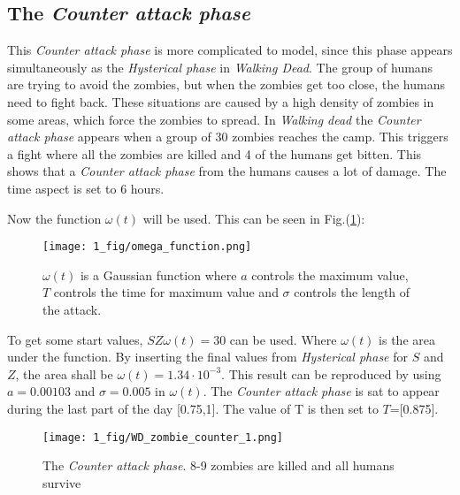 \documentclass[%
twoside,                 %
final,                   %
chapterprefix=true,      %
open=right               %
10pt]{book}
\begin{document}
\subsection{The \emph{Counter attack phase}}
\label{section:counter_attack}
This \emph{Counter attack phase} is more complicated to model, since this phase appears simultaneously as the \emph{Hysterical phase} in \emph{Walking Dead}. The group of humans are trying to avoid the zombies, but when the zombies get too close, the humans need to fight back. These situations are caused by a high density of zombies in some areas, which force the zombies to spread. In \emph{Walking dead} the \emph{Counter attack phase} appears when a group of 30 zombies reaches the camp. This triggers a fight where all the zombies are killed and 4 of the humans get bitten. This shows that a \emph{Counter attack phase} from the humans causes a lot of damage. The time aspect is set to 6 hours.  


\vspace{3mm}




\vspace{3mm}


Now the function $\omega(t)$ will be used. This can be seen in Fig.(\ref{fig:omega_function}):


\begin{figure}[ht]
  \centerline{\texttt{[image: 1\_fig/omega\_function.png]}}
  \caption{
  \label{fig:omega_function} $\omega (t)$ is a Gaussian function where $a$ controls the maximum value, $T$ controls the time for maximum value and $\sigma$ controls the length of the attack.
  }
\end{figure}


To get some start values, $SZ\omega(t)=30$ can be used. Where $\omega(t)$ is the area under the function. By inserting the final values from \emph{Hysterical phase} for $S$ and $Z$, the area shall be $\omega (t)=1.34\cdot10^{-3}$. This result can be reproduced by using $a= 0.00103$ and $\sigma = 0.005$ in $\omega(t)$. The \emph{Counter attack phase} is sat to appear during the last part of the day [0.75,1]. The value of T is then set to $T$=[0.875].


\begin{figure}[ht]
  \centerline{\texttt{[image: 1\_fig/WD\_zombie\_counter\_1.png]}}
  \caption{
  \label{fig:zombie_counter_1} The \emph{Counter attack phase}. 8-9 zombies are killed and all humans survive
  }
\end{figure}
\end{document}
